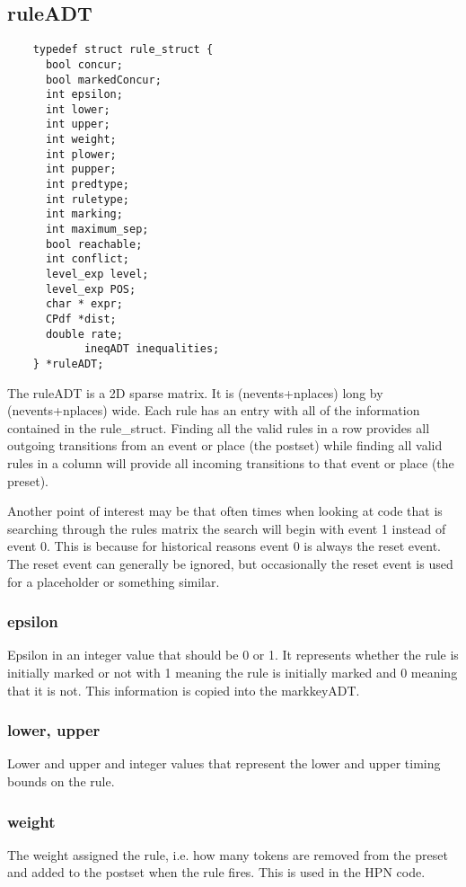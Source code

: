 \documentclass[titlepage,11pt]{article}
\begin{document}
  \subsection{ruleADT}
  \begin{verbatim}
    typedef struct rule_struct {
      bool concur;
      bool markedConcur;
      int epsilon;
      int lower;
      int upper;
      int weight;
      int plower;
      int pupper;
      int predtype;
      int ruletype; 
      int marking;
      int maximum_sep;
      bool reachable;
      int conflict;
      level_exp level;
      level_exp POS;
      char * expr;
      CPdf *dist;
      double rate;
			ineqADT inequalities;
    } *ruleADT;
  \end{verbatim}
  
  The ruleADT is a 2D sparse matrix.  It is (nevents+nplaces) long by
  (nevents+nplaces) wide.  Each rule has an entry with all of the
  information contained in the rule\_struct.  Finding all the valid
  rules in a row provides all outgoing transitions from an event or
  place (the postset) while finding all valid rules in a column will
  provide all incoming transitions to that event or place (the
  preset).
  
  Another point of interest may be that often times when looking at
  code that is searching through the rules matrix the search will
  begin with event 1 instead of event 0.  This is because for
  historical reasons event 0 is always the reset event.  The reset
  event can generally be ignored, but occasionally the reset event is
  used for a placeholder or something similar.

  \subsubsection{epsilon}
  Epsilon in an integer value that should be 0 or 1.  It represents
  whether the rule is initially marked or not with 1 meaning the rule
  is initially marked and 0 meaning that it is not.  This information
  is copied into the markkeyADT.
  
  \subsubsection{lower, upper}
  Lower and upper and integer values that represent the lower and
  upper timing bounds on the rule.

  \subsubsection{weight}
  The weight assigned the rule, i.e. how many tokens are removed from
  the preset and added to the postset when the rule fires.  This is
  used in the HPN code.
\end{document}
